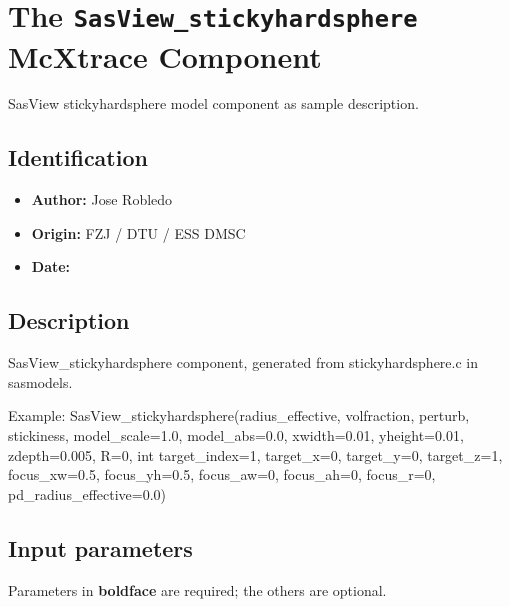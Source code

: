 \section{The \texttt{SasView\_stickyhardsphere} McXtrace Component}
SasView stickyhardsphere model component as sample description.

\subsection*{Identification}
\begin{itemize}
  \item \textbf{Author:} Jose Robledo
  \item \textbf{Origin:} FZJ / DTU / ESS DMSC
  \item \textbf{Date:} 
\end{itemize}

\subsection*{Description}
SasView\_stickyhardsphere component, generated from stickyhardsphere.c in sasmodels.

Example: SasView\_stickyhardsphere(radius\_effective, volfraction, perturb, stickiness, model\_scale=1.0, model\_abs=0.0, xwidth=0.01, yheight=0.01, zdepth=0.005, R=0, int target\_index=1, target\_x=0, target\_y=0, target\_z=1, focus\_xw=0.5, focus\_yh=0.5, focus\_aw=0, focus\_ah=0, focus\_r=0, pd\_radius\_effective=0.0)

\subsection*{Input parameters}
Parameters in \textbf{boldface} are required; the others are optional.

